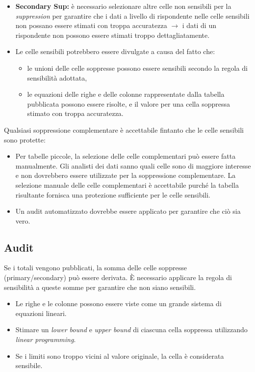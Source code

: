 \documentclass{report}
\begin{document}
\begin{itemize}
    \item \textbf{Secondary Sup:} è necessario selezionare altre celle non sensibili per la \textit{suppression} per garantire che i dati a livello di rispondente nelle celle sensibili non possano essere stimati con troppa accuratezza
    $\rightarrow$ i dati di un rispondente non possono essere stimati troppo dettagliatamente.
    \item Le celle sensibili potrebbero essere divulgate a causa del fatto che:
    \begin{itemize}
        \item le unioni delle celle soppresse possono essere sensibili secondo la regola di sensibilità adottata,
        \item le equazioni delle righe e delle colonne rappresentate dalla tabella pubblicata possono essere risolte, e il valore per una cella soppressa stimato con troppa accuratezza.
    \end{itemize}
\end{itemize}

Qualsiasi soppressione complementare è accettabile fintanto che le celle sensibili sono protette:
\begin{itemize}
    \item Per tabelle piccole, la selezione delle celle complementari può essere fatta manualmente.
    Gli analisti dei dati sanno quali celle sono di maggiore interesse e non dovrebbero essere utilizzate per la soppressione complementare. 
    La selezione manuale delle celle complementari è accettabile purché la tabella risultante fornisca una protezione sufficiente per le celle sensibili.
    \item  Un audit automatizzato dovrebbe essere applicato per garantire che ciò sia vero.
\end{itemize}

\subsection{Audit}
Se i totali vengono pubblicati, la somma delle celle soppresse (primary/secondary) può essere derivata. È necessario applicare la regola di sensibilità a queste somme per garantire che non siano sensibili.
\begin{itemize}
    \item Le righe e le colonne possono essere viste come un grande sistema di equazioni lineari.
    \item Stimare un \textit{lower bound} e \textit{upper bound} di ciascuna cella soppressa utilizzando \textit{linear programming}.
    \item Se i limiti sono troppo vicini al valore originale, la cella è considerata sensibile.
\end{itemize}
\end{document}
